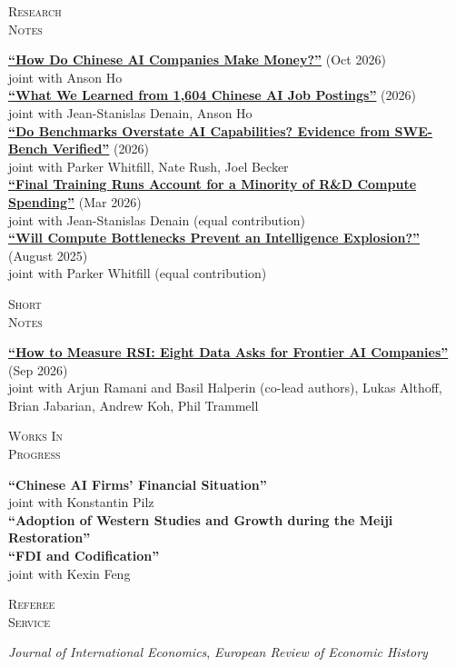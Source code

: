 \documentclass[10pt]{article}
\newlength{\labelcol}\setlength{\labelcol}{1.15in}
\newlength{\contentcol}\setlength{\contentcol}{\dimexpr\textwidth-\labelcol-0.15in\relax}
\newcommand{\cvsection}[2]{%
  \par\vspace{10pt}%
  \begin{minipage}[t]{\labelcol}\textsc{#1}\end{minipage}\hfill
  \begin{minipage}[t]{\contentcol}#2\end{minipage}\par}
\newcommand{\paper}[1]{\textbf{#1}}
\begin{document}
\cvsection{Research\\Notes}{%
  \paper{\href{https://epoch.ai/publications/how-do-chinese-ai-companies-make-money}{``How Do Chinese AI Companies Make Money?''}} (Oct 2026)\\
  joint with Anson Ho\\
  \paper{\href{https://epoch.ai/gradient-updates/what-we-learned-from-1604-chinese-ai-job-postings}{``What We Learned from 1,604 Chinese AI Job Postings''}} (2026)\\
  joint with Jean-Stanislas Denain, Anson Ho\\
  \paper{\href{https://metr.org/notes/2026-03-10-many-swe-bench-passing-prs-would-not-be-merged-into-main/}{``Do Benchmarks Overstate AI Capabilities? Evidence from SWE-Bench Verified''}} (2026)\\
  joint with Parker Whitfill, Nate Rush, Joel Becker\\
  \paper{\href{https://epoch.ai/gradient-updates/r-and-d-vs-training-compute}{``Final Training Runs Account for a Minority of R\&D Compute Spending''}} (Mar 2026)\\
  joint with Jean-Stanislas Denain (equal contribution)\\
  \paper{\href{https://arxiv.org/abs/2507.23181}{``Will Compute Bottlenecks Prevent an Intelligence Explosion?''}} (August 2025)\\
  joint with Parker Whitfill (equal contribution)}

\cvsection{Short\\Notes}{%
  \paper{\href{https://elasticity.institute/how-to-measure-rsi.pdf}{``How to Measure RSI: Eight Data Asks for Frontier AI Companies''}} (Sep 2026)\\
  joint with Arjun Ramani and Basil Halperin (co-lead authors), Lukas Althoff, Brian Jabarian, Andrew Koh, Phil Trammell}

\cvsection{Works In\\Progress}{%
  \paper{``Chinese AI Firms' Financial Situation''}\\
  joint with Konstantin Pilz\\
  \paper{``Adoption of Western Studies and Growth during the Meiji Restoration''}\\
  \paper{``FDI and Codification''}\\
  joint with Kexin Feng}

\cvsection{Referee\\Service}{%
  \textit{Journal of International Economics}, \textit{European Review of Economic History}}
\end{document}
